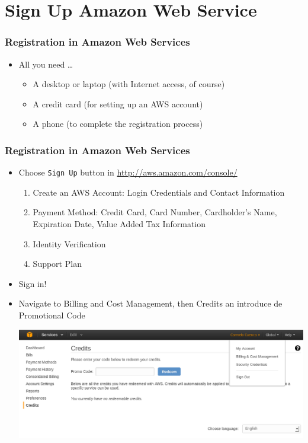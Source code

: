 \documentclass{beamer}
\begin{document}
\section{Sign Up Amazon Web Service}
\begin{frame}[fragile]
\frametitle{Registration in Amazon Web Services}
\begin{itemize}
 \item All you need \dots
 \begin{itemize}
   \item A desktop or laptop (with Internet access, of course)
   \item A credit card (for setting up an AWS account)
   \item A phone (to complete the registration process)
 \end{itemize}
\end{itemize}
\end{frame}
\begin{frame}
\frametitle{Registration in Amazon Web Services}
\begin{itemize}
\item Choose \texttt{Sign Up} button in \url{http://aws.amazon.com/console/} 
\begin{enumerate}
 \item  Create an AWS Account: Login Credentials and Contact Information
  \item Payment Method: Credit Card, Card Number, Cardholder's Name, Expiration Date, Value Added Tax Information
  \item Identity Verification
  \item Support Plan
 \end{enumerate}

\item Sign in!
\item Navigate to Billing and Cost Management, then Credits an introduce de Promotional Code
\begin{center}
\includegraphics[scale=0.25]{credits.png}
\end{center}
\end{itemize}

\end{frame}
\end{document}
